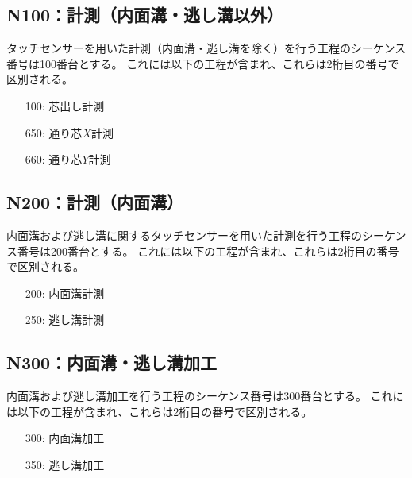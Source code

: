 \subsection{N100：計測（内面溝・逃し溝以外）}
タッチセンサーを用いた計測（内面溝・逃し溝を除く）を行う工程のシーケンス番号は100番台とする。
これには以下の工程が含まれ、これらは2桁目の番号で区別される。
\begin{enumerate}
\item[100:] 芯出し計測
\item[650:] 通り芯$X$計測
\item[660:] 通り芯$Y$計測
\end{enumerate}


\subsection{N200：計測（内面溝）}
内面溝および逃し溝に関するタッチセンサーを用いた計測を行う工程のシーケンス番号は200番台とする。
これには以下の工程が含まれ、これらは2桁目の番号で区別される。
\begin{enumerate}
\item[200:] 内面溝計測
\item[250:] 逃し溝計測
\end{enumerate}


\subsection{N300：内面溝・逃し溝加工}
内面溝および逃し溝加工を行う工程のシーケンス番号は300番台とする。
これには以下の工程が含まれ、これらは2桁目の番号で区別される。
\begin{enumerate}
\item[300:] 内面溝加工
\item[350:] 逃し溝加工
\end{enumerate}



